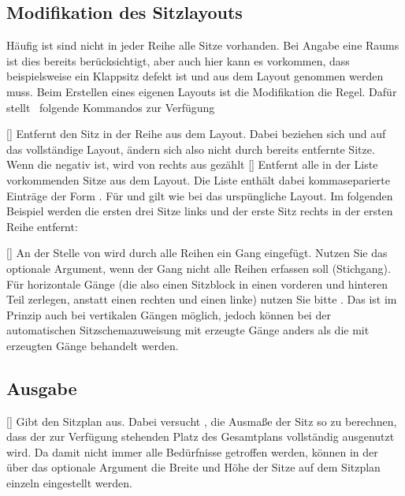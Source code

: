 \documentclass[
babel-options={ngerman},
load-preamble-,
scrartcl={headings=small}
]{cnltx-doc}
\providecommand{\packagename}{tucseating}
\def\thepkg{\pkg*{\packagename}}
\begin{document}
\subsection{Modifikation des Sitzlayouts}
\label{sec:modify-layout}
Häufig ist sind nicht in jeder Reihe alle Sitze vorhanden.
Bei Angabe eine Raums ist dies bereits berücksichtigt, aber auch hier kann es
vorkommen, dass beispielsweise ein Klappsitz defekt ist und aus dem Layout
genommen werden muss.
Beim Erstellen eines eigenen Layouts ist die Modifikation die Regel.
Dafür stellt \pkg\ folgende Kommandos zur Verfügung
\begin{commands}
  []
  Entfernt den Sitz  in der Reihe  aus dem
  Layout. Dabei beziehen sich  und  auf das
  vollständige Layout, ändern sich also nicht durch bereits entfernte Sitze.
  Wenn die  negativ ist, wird von rechts aus gezählt
  []
  Entfernt alle in der Liste vorkommenden Sitze aus dem Layout. Die Liste enthält
  dabei kommaseparierte Einträge der Form
  . Für  und
   gilt wie bei  das urspüngliche Layout.
  Im folgenden Beispiel werden die ersten drei Sitze links und der erste Sitz
  rechts in der ersten Reihe entfernt:
  \begin{example}
  \end{example}\vspace{-1.3\baselineskip}
  []
  An der Stelle von  wird durch alle Reihen ein Gang eingefügt. Nutzen Sie das
  optionale Argument, wenn der Gang nicht alle Reihen erfassen soll (Stichgang).
  Für horizontale Gänge (die also einen Sitzblock in einen vorderen und hinteren
  Teil zerlegen, anstatt einen rechten und einen linke) nutzen Sie bitte
  .
  Das ist im Prinzip auch bei vertikalen Gängen möglich, jedoch können bei der automatischen
  Sitzschemazuweisung mit  erzeugte Gänge anders als die mit
   erzeugten Gänge behandelt werden.
\end{commands}

\subsection{Ausgabe}
\label{sec:drawing}
\begin{commands}
  
  []
  Gibt den Sitzplan aus. Dabei versucht \thepkg, die Ausmaße der Sitz so zu
  berechnen, dass der zur Verfügung stehenden Platz des Gesamtplans vollständig
  ausgenutzt wird.
  Da damit nicht immer alle Bedürfnisse getroffen werden, können in der
  über das optionale Argument die Breite und Höhe der Sitze auf
  dem Sitzplan einzeln eingestellt werden.
\end{commands}
\end{document}
